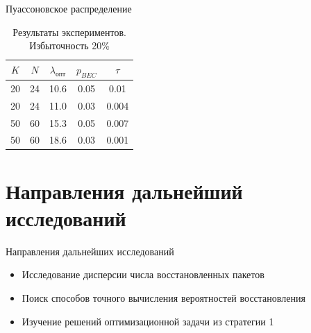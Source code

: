 \documentclass{beamer}
\begin{document}
\begin{frame}{Пуассоновское распределение}
    \begin{table}[h!]
    \begin{center}
        \begin{tabular}{|c|c|c|c|c|}
            \hline
            $K$ & $N$ & $\lambda_{\text{опт}}$ & $p_{BEC}$ & $\tau$ \\ 
            \hline
            20 & 24 & 10.6 & 0.05 & 0.01 \\
            \hline
            20 & 24 & 11.0 & 0.03 & 0.004 \\ 
            \hline 
            50 & 60 & 15.3 & 0.05 & 0.007 \\ 
            \hline
            50 & 60 & 18.6 & 0.03 & 0.001 \\
            \hline
        \end{tabular}
    \caption{Результаты экспериментов. Избыточность 20\%}
    \end{center}
    \end{table}
\end{frame}


\section{Направления дальнейший исследований}

\begin{frame}{Направления дальнейших исследований}

    \begin{itemize}
        \item Исследование дисперсии числа восстановленных пакетов
        \item Поиск способов точного вычисления вероятностей восстановления
        \item Изучение решений оптимизационной задачи из стратегии 1
    \end{itemize}
    
\end{frame}
\end{document}

